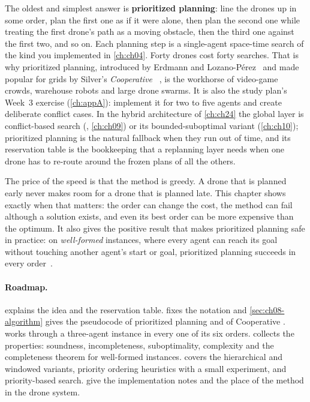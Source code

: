 The oldest and simplest answer is \textbf{prioritized planning}:
line the drones up in some order, plan the first one as if it were alone, then plan the
second one while treating the first drone's path as a moving obstacle, then the third
one against the first two, and so on. Each planning step is a single-agent space-time
\astar search of the kind you implemented in \cref{ch:ch04}. Forty drones cost forty
searches. That is why prioritized planning, introduced by Erdmann and
Lozano-P\'erez~\cite{erdmann1987multiple} and made popular for grids by Silver's
\emph{Cooperative \astar}~\cite{silver2005cooperative}, is the workhorse of video-game
crowds, warehouse robots and large drone swarms. It is also the study plan's Week~3
exercise (\cref{ch:appA}): implement it for two to five agents and create deliberate
conflict cases. In the hybrid architecture of \cref{ch:ch24} the global layer is conflict-based
search (\cbs, \cref{ch:ch09}) or its bounded-suboptimal variant \ecbs
(\cref{ch:ch10}); prioritized planning is the natural fallback when they run out of time, and its
reservation table is the bookkeeping that a replanning layer needs when one drone has to
re-route around the frozen plans of all the others.

The price of the speed is that the method is greedy. A drone that is planned early never
makes room for a drone that is planned late. This chapter shows exactly when that
matters: the order can change the cost, the method can fail although a solution exists,
and even its best order can be more expensive than the optimum. It also gives the
positive result that makes prioritized planning safe in practice: on \emph{well-formed}
instances, where every agent can reach its goal without touching another agent's start
or goal, prioritized planning succeeds in every order~\cite{cap2015prioritized}.

\paragraph{Roadmap.}  explains the idea and the reservation
table.  fixes the notation and \cref{sec:ch08-algorithm} gives the
pseudocode of prioritized planning and of Cooperative \astar. 
works through a three-agent instance in every one of its six orders.
 collects the properties: soundness, incompleteness,
suboptimality, complexity and the completeness theorem for well-formed instances.
 covers the hierarchical and windowed variants, priority
ordering heuristics with a small experiment, and priority-based search.
 give the implementation notes and the
place of the method in the drone system.

